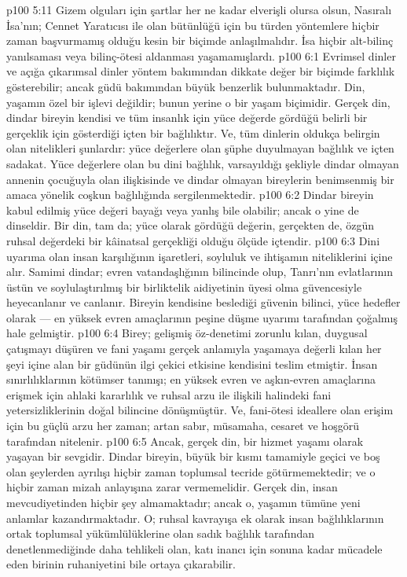 \vs p100 5:11 Gizem olguları için şartlar her ne kadar elverişli olursa olsun, Nasıralı İsa’nın; Cennet Yaratıcısı ile olan bütünlüğü için bu türden yöntemlere hiçbir zaman başvurmamış olduğu kesin bir biçimde anlaşılmalıdır. İsa hiçbir alt\hyp{}bilinç yanılsaması veya bilinç\hyp{}ötesi aldanması yaşamamışlardı.
\vs p100 6:1 Evrimsel dinler ve açığa çıkarımsal dinler yöntem bakımından dikkate değer bir biçimde farklılık gösterebilir; ancak güdü bakımından büyük benzerlik bulunmaktadır. Din, yaşamın özel bir işlevi değildir; bunun yerine o bir yaşam biçimidir. Gerçek din, dindar bireyin kendisi ve tüm insanlık için yüce değerde gördüğü belirli bir gerçeklik için gösterdiği içten bir bağlılıktır. Ve, tüm dinlerin oldukça belirgin olan nitelikleri şunlardır: yüce değerlere olan şüphe duyulmayan bağlılık ve içten sadakat. Yüce değerlere olan bu dini bağlılık, varsayıldığı şekliyle dindar olmayan annenin çocuğuyla olan ilişkisinde ve dindar olmayan bireylerin benimsenmiş bir amaca yönelik coşkun bağlılığında sergilenmektedir.
\vs p100 6:2 Dindar bireyin kabul edilmiş yüce değeri bayağı veya yanlış bile olabilir; ancak o yine de dinseldir. Bir din, tam da; yüce olarak gördüğü değerin, gerçekten de, özgün ruhsal değerdeki bir kâinatsal gerçekliği olduğu ölçüde içtendir.
\vs p100 6:3 Dini uyarıma olan insan karşılığının işaretleri, soyluluk ve ihtişamın niteliklerini içine alır. Samimi dindar; evren vatandaşlığının bilincinde olup, Tanrı’nın evlatlarının üstün ve soylulaştırılmış bir birliktelik aidiyetinin üyesi olma güvencesiyle heyecanlanır ve canlanır. Bireyin kendisine beslediği güvenin bilinci, yüce hedefler olarak --- en yüksek evren amaçlarının peşine düşme uyarımı tarafından çoğalmış hale gelmiştir.
\vs p100 6:4 Birey; gelişmiş öz\hyp{}denetimi zorunlu kılan, duygusal çatışmayı düşüren ve fani yaşamı gerçek anlamıyla yaşamaya değerli kılan her şeyi içine alan bir güdünün ilgi çekici etkisine kendisini teslim etmiştir. İnsan sınırlılıklarının kötümser tanınışı; en yüksek evren ve aşkın\hyp{}evren amaçlarına erişmek için ahlaki kararlılık ve ruhsal arzu ile ilişkili halindeki fani yetersizliklerinin doğal bilincine dönüşmüştür. Ve, fani\hyp{}ötesi ideallere olan erişim için bu güçlü arzu her zaman; artan sabır, müsamaha, cesaret ve hoşgörü tarafından nitelenir.
\vs p100 6:5 Ancak, gerçek din, bir hizmet yaşamı olarak yaşayan bir sevgidir. Dindar bireyin, büyük bir kısmı tamamiyle geçici ve boş olan şeylerden ayrılışı hiçbir zaman toplumsal tecride götürmemektedir; ve o hiçbir zaman mizah anlayışına zarar vermemelidir. Gerçek din, insan mevcudiyetinden hiçbir şey almamaktadır; ancak o, yaşamın tümüne yeni anlamlar kazandırmaktadır. O; ruhsal kavrayışa ek olarak insan bağlılıklarının ortak toplumsal yükümlülüklerine olan sadık bağlılık tarafından denetlenmediğinde daha tehlikeli olan, katı inancı için sonuna kadar mücadele eden birinin ruhaniyetini bile ortaya çıkarabilir.
